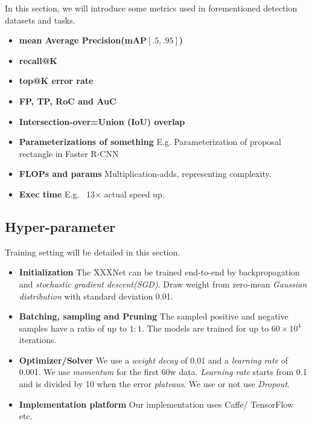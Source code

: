 In this section, we will introduce some metrics used in forementioned 
detection datasets and tasks. 

\begin{itemize}

    \item \textbf{mean Average Precision(mAP$\mathbf{[.5, .95]}$)} 
    \item \textbf{recall@K}
    \item \textbf{top@K error rate} 
    \item \textbf{FP, TP, RoC and AuC}
    \item \textbf{Intersection-over=Union (IoU) overlap}
    \item \textbf{Parameterizations of something} 
    E.g. Parameterization of proposal rectangle in Faster R-CNN

    \item \textbf{FLOPs and params} Multiplication-adds, representing 
    complexity.
    
    \item \textbf{Exec time} E.g. ~13$\times$ actual speed up.

\end{itemize}
    
\subsection{Hyper-parameter}

Training setting will be detailed in this section.

\begin{itemize}

    \item \textbf{Initialization} The XXXNet can be trained end-to-end by 
    backpropagation and \emph{stochastic gradient descent(SGD)}. Draw weight from zero-mean 
    \emph{Gaussian distribution} with standard deviation 0.01.
    
    \item \textbf{Batching, sampling and Pruning} The sampled positive and 
    negative samples have a ratio of up to $1:1$. The models are trained for up to 
    $60\times10^4$ iterations.
    
    \item \textbf{Optimizer/Solver} We use a \emph{weight decay} of 0.01 and 
    a \emph{learning rate} of 0.001. We use \emph{momentum} for the first 60w 
    data. \emph{Learning rate} starts from 0.1 and is divided by 10 when the error 
    \emph{plateaus}. We use or not use \emph{Dropout}.

    \item \textbf{Implementation platform} Our implementation 
    uses Caffe/ TensorFlow etc.\misscite

\end{itemize}